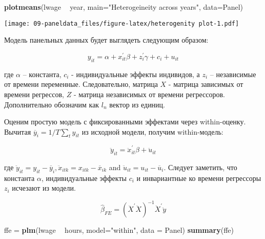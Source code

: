 \documentclass[]{article}
\newenvironment{Shaded}{\begin{snugshade}}{\end{snugshade}}
\newcommand{\DataTypeTok}[1]{\textcolor[rgb]{0.13,0.29,0.53}{#1}}
\newcommand{\KeywordTok}[1]{\textcolor[rgb]{0.13,0.29,0.53}{\textbf{#1}}}
\newcommand{\NormalTok}[1]{#1}
\newcommand{\OperatorTok}[1]{\textcolor[rgb]{0.81,0.36,0.00}{\textbf{#1}}}
\newcommand{\StringTok}[1]{\textcolor[rgb]{0.31,0.60,0.02}{#1}}
\begin{document}
\begin{Shaded}
\begin{Highlighting}[]
\KeywordTok{plotmeans}\NormalTok{(lwage }\OperatorTok{~}\StringTok{ }\NormalTok{year, }\DataTypeTok{main=}\StringTok{"Heterogeineity across years"}\NormalTok{, }\DataTypeTok{data=}\NormalTok{Panel)}
\end{Highlighting}
\end{Shaded}

\texttt{[image: 09-paneldata\_files/figure-latex/heterogenity plot-1.pdf]}

Модель панельных данных будет выглядеть следующим образом:

\begin{equation}
y_{i t}=\alpha+x_{i t}^{\prime} \beta+z_{i}^{\prime} \gamma+c_{i}+u_{i t}
\end{equation}

где \(\alpha\) -- константа, \(c_{i}\) - индивидуальные эффекты
индивидов, а \(z_i\) -- независимые от времени переменные.
Следовательно, матрица \(X\) - матрица зависимых от времени регрессов,
\(Z\) - матрица независимых от времени регрессоров. Дополнительно
обозначим как \(l_n\) вектор из единиц.

Оценим простую модель с фиксированными эффектами через within-оценку.
Вычитая \(\overline{y}_{i}=1 / T \sum_{t} y_{i t}\) из исходной модели,
получим within-модель:

\begin{equation}
\ddot{y}_{i t}=\ddot{x}_{i t}^{\prime} \beta+\ddot{u}_{i t}
\end{equation}

где
\(\ddot{y}_{i t}=y_{i t}-\overline{y}_{i}, \ddot{x}_{i t k}=x_{i t k}-\overline{x}_{i k}\)
and \(\ddot{u}_{i t}=u_{i t}-\overline{u}_{i}\). Следует заметить, что
константа \(\alpha\), индивидуальные эффекты \(c_i\) и инвариантные ко
времени регрессоры \(z_i\) исчезают из модели.

\begin{equation}
\widehat{\beta}_{F E}=\left(\ddot{X}^{\prime} \ddot{X}\right)^{-1} \ddot{X}^{\prime} \ddot{y}
\end{equation}

\begin{Shaded}
\begin{Highlighting}[]
\NormalTok{ffe =}\StringTok{ }\KeywordTok{plm}\NormalTok{(lwage }\OperatorTok{~}\StringTok{ }\NormalTok{hours, }\DataTypeTok{model=}\StringTok{"within"}\NormalTok{, }\DataTypeTok{data =}\NormalTok{ Panel)}
\KeywordTok{summary}\NormalTok{(ffe)}
\end{Highlighting}
\end{Shaded}
\end{document}
